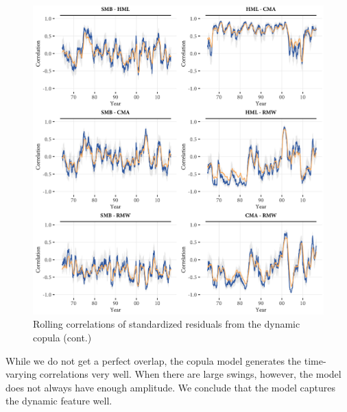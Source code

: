 \begin{figure}[!ht]
  \ContinuedFloat
  \centering
  \caption{Rolling correlations of standardized residuals from the dynamic copula (cont.)}
  \includegraphics[width=\textwidth]{graphics/rolling_simulated2.png}
\end{figure}

While we do not get a perfect overlap, the copula model generates the time-varying correlations very well. When there are large swings, however, the model does not always have enough amplitude. We conclude that the model captures the dynamic feature well.